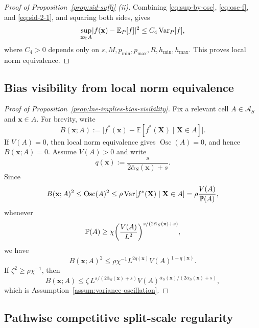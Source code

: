 \documentclass[11pt]{article}
\theoremstyle{plain}
\theoremstyle{definition}
\theoremstyle{remark}
\theoremstyle{plain}
\newcommand{\bx}{\mathbf{x}}
\newcommand{\bX}{\mathbf{X}}
\DeclarePairedDelimiter{\bracks}{[}{]}
\DeclarePairedDelimiter{\paren}{(}{)}
\DeclarePairedDelimiter{\abs}{|}{|}
\renewcommand{\P}{\mathbb{P}}
\newcommand{\E}{\mathbb{E}}
\newcommand{\Var}{\textnormal{Var}}
\newcommand{\1}{\mathbbm{1}}
\newcommand{\Osc}{\operatorname{Osc}}
\begin{document}
\begin{proof}[Proof of Proposition~\ref{prop:sid-suffi} (ii)]
    Combining \eqref{eq:sup-by-osc}, \eqref{eq:osc-f}, and
    \eqref{eq:sid-2-1}, and squaring both sides, gives
    \begin{equation}
      \sup_{\bx \in A}\abs{f(\bx) - \E_P\bracks*{f}}^2 \leq C_4\, \Var_P[f],
    \end{equation}
    where $C_4>0$ depends only on
    $s,M,p_{\min},p_{\max},R,h_{\min},h_{\max}$. This proves local
    norm equivalence.
\end{proof}

\subsection{Bias visibility from local norm equivalence}

\begin{proof}[Proof of Proposition~\ref{prop:lne-implies-bias-visibility}]
Fix a relevant cell $A\in\mathcal A_S$ and $\bx\in A$.
For brevity, write
\[
B(\bx;A):=\bigl|f^*(\bx)-\E[f^*(\bX)\mid \bX\in A]\bigr|.
\]
If $V(A)=0$, then local norm equivalence gives $\Osc(A)=0$, and hence $B(\bx;A)=0$.
Assume $V(A)>0$ and write
\[
q(\bx):=\frac{s}{2\bar\alpha_S(\bx)+s}.
\]
Since
\[
B(\bx;A)^2
\le
\Osc(A)^2
\le
\rho\,\Var[f^*(\bX)\mid\bX\in A]
=
\rho\frac{V(A)}{\P(A)},
\]
whenever
\[
\P(A)
\ge
\chi
\paren*{\frac{V(A)}{L^2}}^{
s/(2\bar\alpha_S(\bx)+s)},
\]
we have
\[
B(\bx;A)^2
\le
\rho\chi^{-1}
L^{2q(\bx)}
V(A)^{1-q(\bx)}.
\]
If $\zeta^2\ge\rho\chi^{-1}$, then
\[
B(\bx;A)
\le
\zeta\,
L^{s/(2\bar\alpha_S(\bx)+s)}
V(A)^{
\bar\alpha_S(\bx)/(2\bar\alpha_S(\bx)+s)},
\]
which is Assumption~\ref{assum:variance-oscillation}.
\end{proof}

\subsection{Pathwise competitive split-scale regularity}
\end{document}
